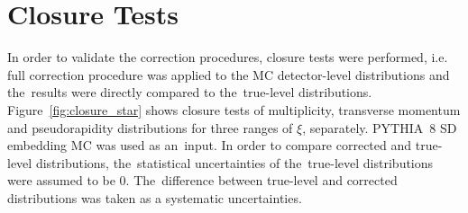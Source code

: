 \section{Closure Tests}\label{section:star_closure}
In order to  validate the correction procedures, 
closure tests were performed, i.e. full correction procedure was applied to the MC detector-level distributions and the~results were directly compared to the~true-level distributions. Figure~\ref{fig:closure_star} shows closure tests of multiplicity, transverse momentum and pseudorapidity distributions for three ranges of $\xi$, separately.  PYTHIA~8 SD embedding \ac{MC} was used as an~input. In order  to compare  corrected and true-level distributions, the~statistical uncertainties of the~true-level distributions were assumed to be $0$. %
The~difference between true-level and corrected distributions was taken as a systematic uncertainties.


